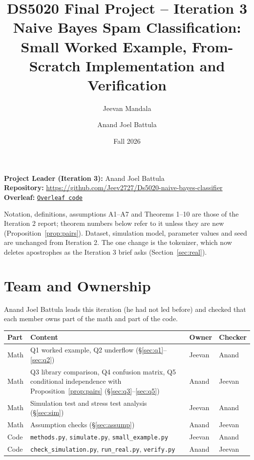 \documentclass[11pt]{article}
\title{DS5020 Final Project -- Iteration 3\\[2pt]
\large Naive Bayes Spam Classification: Small Worked Example, From-Scratch Implementation and Verification}
\author{Jeevan Mandala \and Anand Joel Battula}
\date{Fall 2026}
\theoremstyle{plain}
\begin{document}
\maketitle

\noindent\textbf{Project Leader (Iteration 3):} Anand Joel Battula\\
\textbf{Repository:} \url{https://github.com/Jeev2727/Ds5020-naive-bayes-classifier}\\
\textbf{Overleaf:} \href{https://www.overleaf.com/project/6b00d37c0b39a891f5669bfb/share#b636ef3bb6d1cd0b79b8563a9355bf45898555bc0a6e8363}{\texttt{Overleaf code}}

\medskip
\noindent Notation, definitions, assumptions A1--A7 and Theorems 1--10 are those of the Iteration 2
report; theorem numbers below refer to it unless they are new (Proposition~\ref{prop:pairs}).
Dataset, simulation model, parameter values and seed are unchanged from Iteration 2. The one
change is the tokenizer, which now deletes apostrophes as the Iteration 3 brief asks
(Section~\ref{sec:real}).

\tableofcontents

\section{Team and Ownership}
Anand Joel Battula leads this iteration (he had not led before) and checked that each member
owns part of the math and part of the code.

\begin{center}
\begin{tabularx}{\textwidth}{@{}lXll@{}}
\toprule
Part & Content & Owner & Checker\\
\midrule
Math & Q1 worked example, Q2 underflow (\S\ref{sec:q1}--\ref{sec:q2}) & Jeevan & Anand\\
Math & Q3 library comparison, Q4 confusion matrix, Q5 conditional independence with Proposition~\ref{prop:pairs} (\S\ref{sec:q3}--\ref{sec:q5}) & Anand & Jeevan\\
Math & Simulation test and stress test analysis (\S\ref{sec:sim}) & Jeevan & Anand\\
Math & Assumption checks (\S\ref{sec:assump}) & Anand & Jeevan\\
Code & \texttt{methods.py}, \texttt{simulate.py}, \texttt{small\_example.py} & Jeevan & Anand\\
Code & \texttt{check\_simulation.py}, \texttt{run\_real.py}, \texttt{verify.py} & Anand & Jeevan\\
\bottomrule
\end{tabularx}
\end{center}
\end{document}
